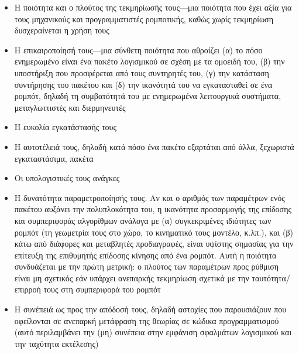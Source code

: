 \begin{itemize}
  \item Η ποιότητα και ο πλούτος της τεκμηρίωσής τους---μια ποιότητα που έχει
        αξία για τους μηχανικούς και προγραμματιστές ρομποτικής, καθώς χωρίς
        τεκμηρίωση δυσχεραίνεται η χρήση τους
  \item Η επικαιροποίησή τους---μια σύνθετη ποιότητα που αθροίζει (α) το πόσο
        ενημερωμένο είναι ένα πακέτο λογισμικού σε σχέση με τα ομοειδή του, (β)
        την υποστήριξη που προσφέρεται από τους συντηρητές του, (γ) την
        κατάσταση συντήρησης του πακέτου και (δ) την ικανότητά του
        να εγκατασταθεί σε ένα ρομπότ, δηλαδή τη συμβατότητά του με
        ενημερωμένα λειτουργικά συστήματα, μεταγλωττιστές και διερμηνευτές
  \item Η ευκολία εγκατάστασής τους
  \item Η αυτοτέλειά τους, δηλαδή κατά πόσο ένα πακέτο εξαρτάται από άλλα,
        ξεχωριστά εγκαταστάσιμα, πακέτα
  \item Οι υπολογιστικές τους ανάγκες
  \item Η δυνατότητα παραμετροποίησής τους. Αν και ο αριθμός των παραμέτρων ενός
        πακέτου αυξάνει την πολυπλοκότητα του, η ικανότητα προσαρμογής της
        επίδοσης και συμπεριφοράς αλγορίθμων ανάλογα με (α) συγκεκριμένες
        ιδιότητες των ρομπότ (τη γεωμετρία τους στο χώρο, το κινηματικό τους
        μοντέλο, κ.λπ.), και (β) κάτω από διάφορες και μεταβλητές
        προδιαγραφές, είναι υψίστης σημασίας για την επίτευξη της επιθυμητής
        επίδοσης κίνησης από ένα ρομπότ. Αυτή η ποιότητα συνδυάζεται με την
        πρώτη μετρική: ο πλούτος των παραμέτρων προς ρύθμιση είναι μη σχετικός
        εάν υπάρχει ανεπαρκής τεκμηρίωση σχετικά με την ταυτότητα/επιρροή τους
        στη συμπεριφορά του ρομπότ
  \item Η συνέπειά ως προς την απόδοσή τους, δηλαδή αστοχίες που παρουσιάζουν
        που οφείλονται σε ανεπαρκή μετάφραση της θεωρίας σε κώδικα
        προγραμματισμού (αυτό περιλαμβάνει την (μη) συνέπεια στην εμφάνιση
        σφαλμάτων λογισμικού και την ταχύτητα εκτέλεσης)
\end{itemize}

